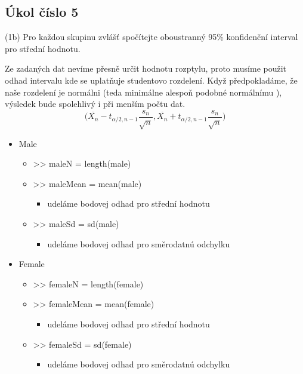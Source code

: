 \documentclass[paper=a4, fontsize=12pt]{scrartcl}
\numberwithin{equation}{section}		%
\numberwithin{figure}{section}			%
\numberwithin{table}{section}				%
\begin{document}
\subsection{Úkol číslo 5}
(1b) Pro každou skupinu zvlášť spočítejte oboustranný 95\% konfidenční interval pro střední hodnotu.
\newline\par
Ze zadaných dat nevíme přesně určit hodnotu rozptylu, proto musíme použit odhad intervalu kde se uplatňuje studentovo rozdelení. Když předpokladáme, že naše rozdelení je normálni (teda minimálne alespoň podobné normálnímu ), výsledek bude spolehlivý i při menším počtu dat. 
\[ 
\bigg(\overline{X_n} - t_{\alpha/2,n-1}\frac{s_n}{\sqrt{n}},
 \overline{X_n} + t_{\alpha/2,n-1}\frac{s_n}{\sqrt{n}} \bigg) 
\] 
\begin{itemize}
	\item Male
	\begin{itemize}
		\item >> maleN = length(male)
	\end{itemize}
	\begin{itemize}
		\item >> maleMean = mean(male)
		\begin{itemize}
			\item udeláme bodovej odhad pro střední hodnotu	
		\end{itemize}
	\end{itemize}
	\begin{itemize}
		\item >> maleSd = sd(male)
		\begin{itemize}
			\item udeláme bodovej odhad pro směrodatnú odchylku %
		\end{itemize}
	\end{itemize}
	\item Female
	\begin{itemize}
		\item >> femaleN = length(female)
	\end{itemize}
	\begin{itemize}
		\item >> femaleMean = mean(female)
		\begin{itemize}
				\item udeláme bodovej odhad pro střední hodnotu	
		\end{itemize}
	\end{itemize}
	\begin{itemize}
		\item >> femaleSd = sd(female)
		\begin{itemize}
			\item udeláme bodovej odhad pro směrodatnú odchylku %
		\end{itemize}
	\end{itemize}
\end{itemize}
\end{document}
